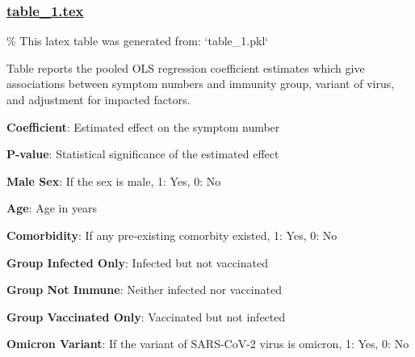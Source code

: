 \documentclass[11pt]{article}
\begin{document}
\subsubsection*{\hyperlink{code-LaTeX Table Design-table-1-tex}{table\_1.tex}}

\begin{codeoutput}
\% This latex table was generated from: `table\_1.pkl`
\begin{table}[h]
\caption{Model estimates of the factors influencing symptom numbers}
\label{table:model\_estimates}
\begin{threeparttable}
\renewcommand{\TPTminimum}{\linewidth}
\begin{tablenotes}
\footnotesize
\item Table reports the pooled OLS regression coefficient estimates which give associations between symptom numbers and immunity group, variant of virus, and adjustment for impacted factors.
\item \textbf{Coefficient}: Estimated effect on the symptom number
\item \textbf{P-value}: Statistical significance of the estimated effect
\item \textbf{Male Sex}: If the sex is male, 1: Yes, 0: No
\item \textbf{Age}: Age in years
\item \textbf{Comorbidity}: If any pre-existing comorbity existed, 1: Yes, 0: No
\item \textbf{Group Infected Only}: Infected but not vaccinated
\item \textbf{Group Not Immune}: Neither infected nor vaccinated
\item \textbf{Group Vaccinated Only}: Vaccinated but not infected
\item \textbf{Omicron Variant}: If the variant of SARS-CoV-2 virus is omicron, 1: Yes, 0: No
\end{tablenotes}
\end{threeparttable}
\end{table}
\end{codeoutput}
\end{document}
